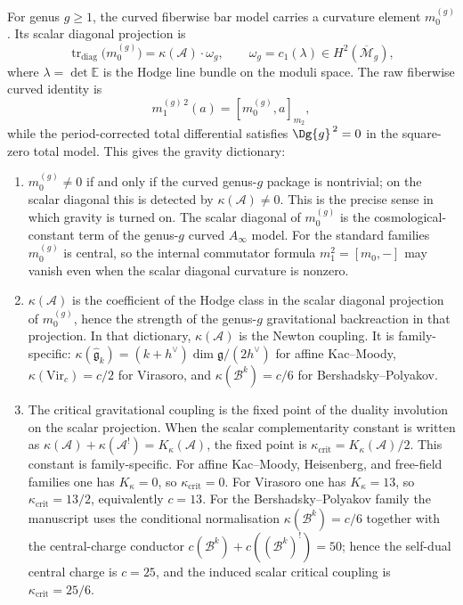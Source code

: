 \begin{remark}
\label{rem:curved-ainfty-gravity-dictionary}
For genus $g \geq 1$, the curved fiberwise bar model carries a
curvature element $m_0^{(g)}$. Its scalar diagonal projection is
\[
 \operatorname{tr}_{\mathrm{diag}}\!\bigl(m_0^{(g)}\bigr)
 = \kappa(\mathcal{A}) \cdot \omega_g,
 \qquad
 \omega_g = c_1(\lambda) \in H^2(\overline{\mathcal{M}}_g),
\]
where $\lambda = \det \mathbb{E}$ is the Hodge line bundle on the moduli space. The raw fiberwise curved identity is
\[
 m_1^{(g)\,2}(a)=[m_0^{(g)},a]_{m_2},
\]
while the period-corrected total differential satisfies
$\Dg{g}^{\,2}=0$ in the square-zero total model. This gives the
gravity dictionary:
\begin{enumerate}[label=(\roman*)]
\item $m_0^{(g)} \neq 0$ if and only if the curved genus-$g$ package is nontrivial; on the scalar diagonal this is detected by $\kappa(\mathcal{A}) \neq 0$. This is the precise sense in which gravity is turned on. The scalar diagonal of $m_0^{(g)}$ is the cosmological-constant term of the genus-$g$ curved $A_\infty$ model. For the standard families $m_0^{(g)}$ is central, so the internal commutator formula $m_1^2 = [m_0,-]$ may vanish even when the scalar diagonal curvature is nonzero.
\item $\kappa(\mathcal{A})$ is the coefficient of the Hodge class in the scalar diagonal projection of $m_0^{(g)}$, hence the strength of the genus-$g$ gravitational backreaction in that projection. In that dictionary, $\kappa(\mathcal{A})$ is the Newton coupling. It is family-specific: $\kappa(\widehat{\mathfrak{g}}_k) = (k+h^\vee)\dim\mathfrak{g}/(2h^\vee)$ for affine Kac--Moody, $\kappa(\mathrm{Vir}_c) = c/2$ for Virasoro, and $\kappa(\mathcal{B}^k) = c/6$ for Bershadsky--Polyakov.
\item The critical gravitational coupling is the fixed point of the duality involution on the scalar projection. When the scalar complementarity constant is written as $\kappa(\mathcal{A}) + \kappa(\mathcal{A}^!) = K_\kappa(\mathcal{A})$, the fixed point is $\kappa_{\mathrm{crit}} = K_\kappa(\mathcal{A})/2$. This constant is family-specific. For affine Kac--Moody, Heisenberg, and free-field families one has $K_\kappa = 0$, so $\kappa_{\mathrm{crit}} = 0$. For Virasoro one has $K_\kappa = 13$, so $\kappa_{\mathrm{crit}} = 13/2$, equivalently $c = 13$. For the Bershadsky--Polyakov family the manuscript uses the conditional normalisation $\kappa(\mathcal{B}^k) = c/6$ together with the central-charge conductor $c(\mathcal{B}^k) + c((\mathcal{B}^k)^!) = 50$; hence the self-dual central charge is $c = 25$, and the induced scalar critical coupling is $\kappa_{\mathrm{crit}} = 25/6$.
\end{enumerate}
\end{remark}

